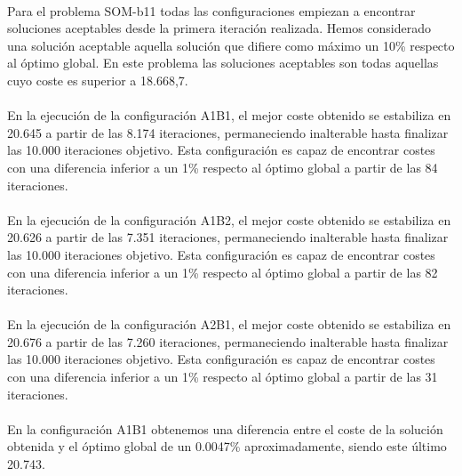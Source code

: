 	\paragraph{}Para el problema SOM-b11 todas las configuraciones empiezan a encontrar soluciones aceptables desde la primera iteración realizada. Hemos considerado una solución aceptable aquella solución que difiere como máximo un 10\% respecto al óptimo global. En este problema las soluciones aceptables son todas aquellas cuyo coste es superior a 18.668,7.
	
	\paragraph{}En la ejecución de la configuración A1B1, el mejor coste obtenido se estabiliza en 20.645 a partir de las 8.174 iteraciones, permaneciendo inalterable hasta finalizar las 10.000 iteraciones objetivo. Esta configuración es capaz de encontrar costes con una diferencia inferior a un 1\% respecto al óptimo global a partir de las 84 iteraciones.
	
	\paragraph{}En la ejecución de la configuración A1B2, el mejor coste obtenido se estabiliza en 20.626 a partir de las 7.351 iteraciones, permaneciendo inalterable hasta finalizar las 10.000 iteraciones objetivo. Esta configuración es capaz de encontrar costes con una diferencia inferior a un 1\% respecto al óptimo global a partir de las 82 iteraciones.
	
	\paragraph{}En la ejecución de la configuración A2B1, el mejor coste obtenido se estabiliza en 20.676 a partir de las 7.260 iteraciones, permaneciendo inalterable hasta finalizar las 10.000 iteraciones objetivo. Esta configuración es capaz de encontrar costes con una diferencia inferior a un 1\% respecto al óptimo global a partir de las 31 iteraciones.
	
	\paragraph{}En la configuración A1B1 obtenemos una diferencia entre el coste de la solución obtenida y el óptimo global de un 0.0047\% aproximadamente, siendo este último 20.743.
	

